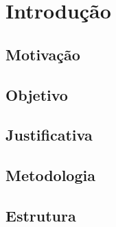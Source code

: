 \chapter{Introdução}

\section{Motivação}

\section{Objetivo}

\section{Justificativa}

\section{Metodologia}

\section{Estrutura}